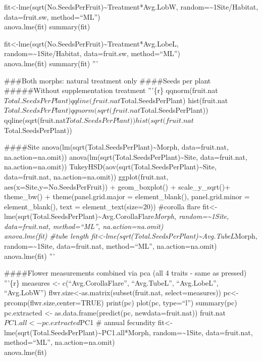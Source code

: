 \documentclass[]{article}
\begin{document}
fit\textless{}-lme(sqrt(No.SeedsPerFruit)\textasciitilde{}Treatment*Avg.LobW,
random=\textasciitilde{}1\textbar{}Site/Habitat, data=fruit.sw,
method=``ML'')\\
anova.lme(fit) summary(fit)

fit\textless{}-lme(sqrt(No.SeedsPerFruit)\textasciitilde{}Treatment*Avg.LobeL,
random=\textasciitilde{}1\textbar{}Site/Habitat, data=fruit.sw,
method=``ML'')\\
anova.lme(fit) summary(fit) '''

\#\#\#Both morphs: natural treatment only \#\#\#\#Seeds per plant
\#\#\#\#\#Without supplementation treatment '''\{r\}
qqnorm(fruit.nat\(Total.SeedsPerPlant) qqline(fruit.nat\)Total.SeedsPerPlant)
hist(fruit.nat\(Total.SeedsPerPlant) qqnorm(sqrt(fruit.nat\)Total.SeedsPerPlant))
qqline(sqrt(fruit.nat\(Total.SeedsPerPlant)) hist(sqrt(fruit.nat\)Total.SeedsPerPlant))

\#\#\#\#Site anova(lm(sqrt(Total.SeedsPerPlant)\textasciitilde{}Morph,
data=fruit.nat, na.action=na.omit))
anova(lm(sqrt(Total.SeedsPerPlant)\textasciitilde{}Site, data=fruit.nat,
na.action=na.omit))
TukeyHSD(aov(sqrt(Total.SeedsPerPlant)\textasciitilde{}Site,
data=fruit.nat, na.action=na.omit)) ggplot(fruit.nat,
aes(x=Site,y=No.SeedsPerFruit)) + geom\_boxplot() + scale\_y\_sqrt()+
theme\_bw() + theme(panel.grid.major = element\_blank(),
panel.grid.minor = element\_blank(), text = element\_text(size=20))
\#corolla flare
fit\textless{}-lme(sqrt(Total.SeedsPerPlant)\textasciitilde{}Avg.CorollaFlare\emph{Morph,
random=\textasciitilde{}1\textbar{}Site, data=fruit.nat, method=``ML'',
na.action=na.omit)\\
anova.lme(fit) \#tube length
fit\textless{}-lme(sqrt(Total.SeedsPerPlant)\textasciitilde{}Avg.TubeL}Morph,
random=\textasciitilde{}1\textbar{}Site, data=fruit.nat, method=``ML'',
na.action=na.omit)\\
anova.lme(fit) '''

\#\#\#\#Flower measurements combined via pca (all 4 traits - same as
pressed) '''\{r\} measures \textless{}- c(``Avg.CorollaFlare'',
``Avg.TubeL'', ``Avg.LobeL'', ``Avg.LobW'')
flwr.size\textless{}-as.matrix(subset(fruit.nat, select=measures))
pc\textless{}-prcomp(flwr.size,center=TRUE) print(pc) plot(pc,
type=``l'') summary(pc) pc.extracted \textless{}-
as.data.frame(predict(pc, newdata=fruit.nat))
fruit.nat\(PC1.all <- pc.extracted\)PC1 \# annual fecundity
fit\textless{}-lme(sqrt(Total.SeedsPerPlant)\textasciitilde{}PC1.all*Morph,
random=\textasciitilde{}1\textbar{}Site, data=fruit.nat, method=``ML'',
na.action=na.omit)\\
anova.lme(fit)
\end{document}
